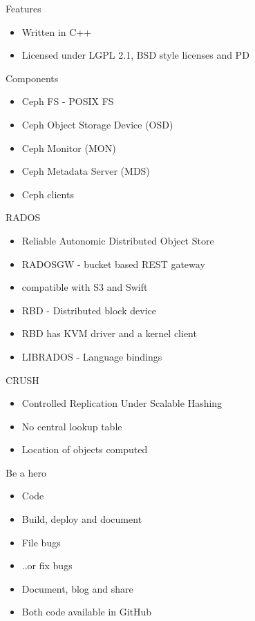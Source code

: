 \documentclass{beamer}
\begin{document}
\begin{frame}{Features}
\begin{itemize}
 \item Written in C++
 \item Licensed under LGPL 2.1, BSD style licenses and PD
\end{itemize}
\end{frame}

\begin{frame}{Components}
\begin{itemize}
 \item Ceph FS - POSIX FS
 \item Ceph Object Storage Device (OSD)
 \item Ceph Monitor (MON)
 \item Ceph Metadata Server (MDS)
 \item Ceph clients
\end{itemize}
\end{frame}

\begin{frame}{RADOS}
\begin{itemize}
 \item Reliable Autonomic Distributed Object Store
 \item RADOSGW - bucket based REST gateway
 \item compatible with S3 and Swift
 \item RBD - Distributed block device
 \item RBD has KVM driver and a kernel client
 \item LIBRADOS - Language bindings
\end{itemize}
\end{frame}

\begin{frame}{CRUSH}
\begin{itemize}
 \item Controlled Replication Under Scalable Hashing
 \item No central lookup table
 \item Location of objects computed
\end{itemize}
\end{frame}


\begin{frame}{Be a hero}
\begin{itemize}
 \item Code
 \item Build, deploy and document
 \item File bugs
 \item ..or fix bugs
 \item Document, blog and share
 \item Both code available in GitHub
\end{itemize}
\end{frame}
\end{document}
